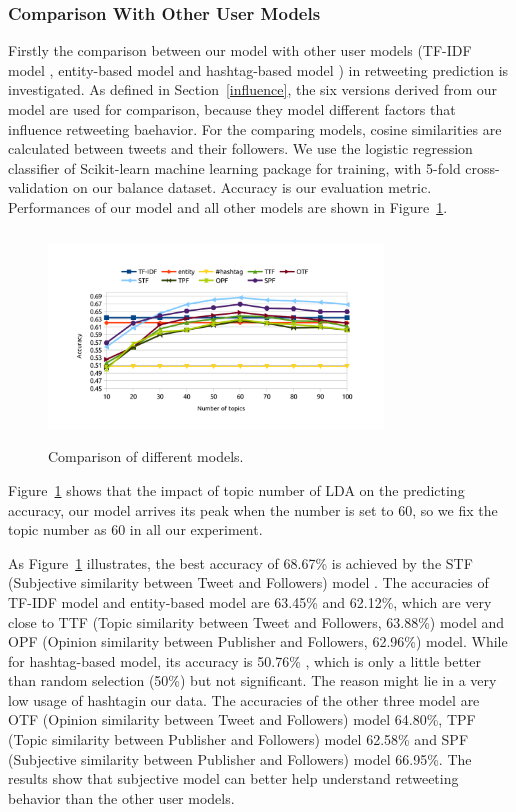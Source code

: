 \documentclass{acm_proc_article-sp}
\begin{document}
\subsubsection{Comparison With Other User Models}
\label{comparison}
Firstly the comparison between our model with other user models (TF-IDF model \cite{Luo:2013RMF}, entity-based model and hashtag-based model \cite{Abel:2011AUM}) in retweeting prediction is investigated.
As defined in Section~\ref{influence}, the six versions derived from our model are used for comparison, because they model different factors that influence retweeting baehavior.
For the comparing models, cosine similarities are calculated between tweets and their followers.
We use the logistic regression classifier of Scikit-learn machine learning package \cite{scikit-learn} for training, with 5-fold cross-validation on our balance dataset. Accuracy is our evaluation metric.
Performances of our model and all other models are shown in Figure~\ref{fig:graph7}.
\begin{figure}[htb]
\centering
\includegraphics[width=3.5in,height=2.2in]{comparison.pdf}
\caption{Comparison of different models.}
\label{fig:graph7}
\end{figure}
Figure~\ref{fig:graph7} shows that the impact of topic number of LDA on the predicting accuracy, our model arrives its peak when the number is set to 60, so we fix the topic number as 60 in all our experiment.

As Figure~\ref{fig:graph7} illustrates, the best accuracy of 68.67\% is achieved by the STF (Subjective similarity between Tweet and Followers) model .
The accuracies of TF-IDF model and entity-based model are 63.45\% and 62.12\%, which are very close to TTF (Topic similarity between Tweet and Followers, 63.88\%) model and OPF (Opinion similarity between Publisher and Followers, 62.96\%) model.
While for hashtag-based model, its accuracy is  50.76\% , which is only a little better than random selection (50\%) but not significant. The reason might lie in a very low usage of hashtagin our data. 
The accuracies of the other three model are OTF (Opinion similarity between Tweet and Followers) model 64.80\%, TPF (Topic similarity between Publisher and Followers) model 62.58\% and SPF (Subjective similarity between Publisher and Followers) model 66.95\%.
The results show that subjective model can better help understand retweeting behavior than the other user models.
\end{document}
